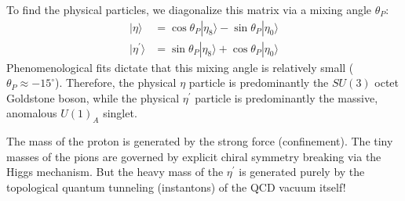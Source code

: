\documentclass[12pt, a4paper]{article}
\begin{document}
To find the physical particles, we diagonalize this matrix via a mixing angle $\theta_P$:
\begin{align*}
|\eta\rangle &= \cos\theta_P |\eta_8\rangle - \sin\theta_P |\eta_0\rangle \\
|\eta^\prime\rangle &= \sin\theta_P |\eta_8\rangle + \cos\theta_P |\eta_0\rangle
\end{align*}
Phenomenological fits dictate that this mixing angle is relatively small ($\theta_P \approx -15^\circ$). Therefore, the physical $\eta$ particle is predominantly the $SU(3)$ octet Goldstone boson, while the physical $\eta^\prime$ particle is predominantly the massive, anomalous $U(1)_A$ singlet.

\vspace{1cm}
\begin{tcolorbox}[colback=blue!5!white,colframe=blue!75!black,title=Summary]
The mass of the proton is generated by the strong force (confinement). The tiny masses of the pions are governed by explicit chiral symmetry breaking via the Higgs mechanism. But the heavy mass of the $\eta^\prime$ is generated purely by the topological quantum tunneling (instantons) of the QCD vacuum itself!
\end{tcolorbox}
\end{document}

